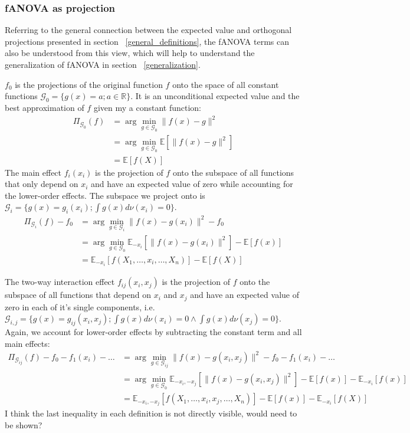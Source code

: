 

\subsubsection*{fANOVA as projection}
Referring to the general connection between the expected value and orthogonal projections presented in section ~\ref{general_definitions}, the fANOVA terms can also be understood from this view, which will help to understand the generalization of fANOVA in section ~\ref{generalization}.\par

$f_0$ is the projections of the original function $f$ onto the space of all constant functions $\mathcal{G}_0 = \{g(x) = a; a \in \mathbb{R}\}$. It is an unconditional expected value and the best approximation of $f$ given my a constant function:
\begin{align*}
    \Pi_{\mathcal{G}_0}(f) 
    &= \arg \min_{g \in \mathcal{G}_0} \|f(x) - g\|^2 \\
    &= \arg \min_{g \in \mathcal{G}_0} \mathbb{E}[\|f(x) - g\|^2] \\
    &= \mathbb{E}[f(X)]
\end{align*}
The main effect $f_i(x_i)$ is the projection of $f$ onto the subspace of all functions that only depend on $x_i$ and have an expected value of zero while accounting for the lower-order effects. The subspace we project onto is $\mathcal{G}_i = \{g(x) = g_i(x_i); \int g(x) d\nu (x_i) = 0\}$.
\begin{align*}
    \Pi_{\mathcal{G}_i}(f) - f_0
    &= \arg \min_{g \in \mathcal{G}_i} \|f(x) - g(x_i)\|^2 - f_0\\
    &= \arg \min_{g \in \mathcal{G}_0} \mathbb{E}_{-x_i}[\|f(x) - g(x_i)\|^2] - \mathbb{E}[f(x)] \\
    &= \mathbb{E}_{-x_i}[f(X_1, \dots, x_i, \dots, X_n)] - \mathbb{E}[f(X)]
\end{align*}

The two-way interaction effect $f_{ij}(x_i,x_j)$ is the projection of $f$ onto the subspace of all functions that depend on $x_i$ and $x_j$ and have an expected value of zero in each of it's single components, i.e. $\mathcal{G}_{i,j} = \{g(x) = g_{ij}(x_i, x_j); \int g(x) d\nu (x_i) = 0 \land \int g(x) d\nu (x_j) = 0\}$. Again, we account for lower-order effects by subtracting the constant term and all main effects:
\begin{align*}
    \Pi_{\mathcal{G}_{ij}}(f) - f_0 - f_1(x_i) - \dots
    &= \arg \min_{g \in \mathcal{G}_{ij}} \|f(x) - g(x_i, x_j)\|^2 - f_0 - f_1(x_i) - \dots \\
    &= \arg \min_{g \in \mathcal{G}_0} \mathbb{E}_{-x_i, -x_j}[\|f(x) - g(x_i, x_j)\|^2] - \mathbb{E}[f(x)] - \mathbb{E}_{-x_i}[f(x)]\\
    &= \mathbb{E}_{-x_i, -x_j}[f(X_1, \dots, x_i, x_j, \dots, X_n)] - \mathbb{E}[f(x)] - \mathbb{E}_{-x_i}[f(X)]
\end{align*}
{\color{blue}I think the last inequality in each definition is not directly visible, would need to be shown?}

